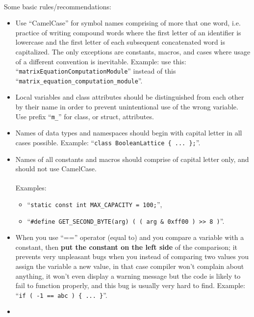 \documentclass[a4paper,twoside,15pt]{book}
\begin{document}
        \paragraph{}
        Some basic rules/recommendations:
        \begin{itemize}
            \item
                Use ``CamelCase'' for symbol names comprising of more that one word, i.e. practice of writing compound words where the first letter of an identifier is lowercase and the first letter of each subsequent concatenated word is capitalized. The only exceptions are constants, macros, and cases where usage of a different convention is inevitable. Example: use this: ``\verb'matrixEquationComputationModule''' instead of this ``\verb'matrix_equation_computation_module'''.
            \item
                Local variables and class attributes should be distinguished from each other by their name in order to prevent unintentional use of the wrong variable. Use prefix ``\verb'm_''' for class, or struct, attributes.
            \item
                Names of data types and namespaces should begin with capital letter in all cases possible. Example: ``\verb'class BooleanLattice { ... };'''.
            \item
                Names of all constants and macros should comprise of capital letter only, and should not use CamelCase.\\\\
                Examples:
                \begin{itemize}
                    \item ``\verb'static const int MAX_CAPACITY = 100;''',
                    \item ``\verb'#define GET_SECOND_BYTE(arg) ( ( arg & 0xff00 ) >> 8 )'''.
                \end{itemize}
            \item
                When you use ``=='' operator (equal to) and you compare a variable with a constant, then \textbf{put the constant on the left side} of the comparison; it prevents very unpleasant bugs when you instead of comparing two values you assign the variable a new value, in that case compiler won't complain about anything, it won't even display a warning message but the code is likely to fail to function properly, and this bug is usually very hard to find. Example: ``\verb'if ( -1 == abc ) { ... }'''.
            \item

\end{itemize}
\end{document}
